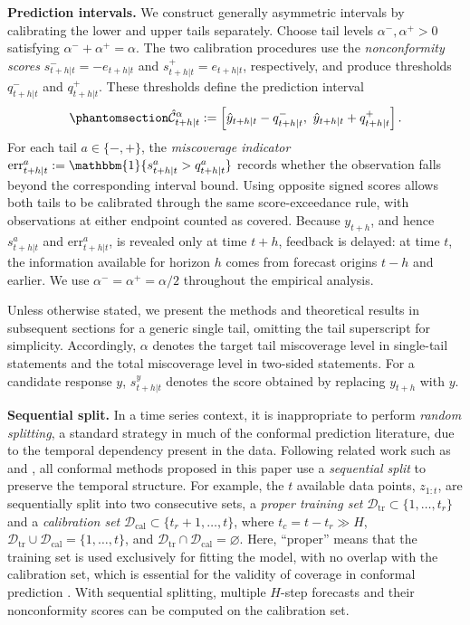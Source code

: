 \documentclass[
  american,
  12pt]{article}
\theoremstyle{plain}
\theoremstyle{plain}
\theoremstyle{remark}
\begin{document}
\textbf{Prediction intervals.} We construct generally asymmetric
intervals by calibrating the lower and upper tails separately. Choose
tail levels \(\alpha^{-},\alpha^{+}>0\) satisfying
\(\alpha^{-}+\alpha^{+}=\alpha\). The two calibration procedures use the
\emph{nonconformity scores} \(s_{t+h|t}^{-}=-e_{t+h|t}\) and
\(s_{t+h|t}^{+}=e_{t+h|t}\), respectively, and produce thresholds
\(q_{t+h|t}^{-}\) and \(q_{t+h|t}^{+}\). These thresholds define the
prediction interval
\begin{equation}\phantomsection\label{eq-two-sided-pi}{
\hat{\mathcal{C}}_{t+h|t}^{\alpha}
:=\left[\hat y_{t+h|t}-q_{t+h|t}^{-},\ \hat y_{t+h|t}+q_{t+h|t}^{+}\right].
}\end{equation} For each tail \(a\in\{-,+\}\), the \emph{miscoverage
indicator}
\(\mathrm{err}_{t+h|t}^{a}:=\mathbbm{1}\{s_{t+h|t}^{a}>q_{t+h|t}^{a}\}\)
records whether the observation falls beyond the corresponding interval
bound. Using opposite signed scores allows both tails to be calibrated
through the same score-exceedance rule, with observations at either
endpoint counted as covered. Because \(y_{t+h}\), and hence
\(s_{t+h|t}^{a}\) and \(\mathrm{err}_{t+h|t}^{a}\), is revealed only at
time \(t+h\), feedback is delayed: at time \(t\), the information
available for horizon \(h\) comes from forecast origins \(t-h\) and
earlier. We use \(\alpha^{-}=\alpha^{+}=\alpha/2\) throughout the
empirical analysis.

Unless otherwise stated, we present the methods and theoretical results
in subsequent sections for a generic single tail, omitting the tail
superscript for simplicity. Accordingly, \(\alpha\) denotes the target
tail miscoverage level in single-tail statements and the total
miscoverage level in two-sided statements. For a candidate response
\(y\), \(s_{t+h|t}^{y}\) denotes the score obtained by replacing
\(y_{t+h}\) with \(y\).

\textbf{Sequential split.} In a time series context, it is inappropriate
to perform \emph{random splitting}, a standard strategy in much of the
conformal prediction literature, due to the temporal dependency present
in the data. Following related work such as \citet{wisniewski2020} and
\citet{zaffran2022}, all conformal methods proposed in this paper use a
\emph{sequential split} to preserve the temporal structure. For example,
the \(t\) available data points, \(z_{1:t}\), are sequentially split
into two consecutive sets, a \emph{proper training set}
\(\mathcal{D}_{\text{tr}} \subset \{1, \dots, t_r\}\) and a
\emph{calibration set}
\(\mathcal{D}_{\text{cal}} \subset \{t_r+1, \dots, t\}\), where
\(t_c=t-t_r \gg H\),
\(\mathcal{D}_{\text{tr}} \cup \mathcal{D}_{\text{cal}} = \{1, \dots, t\}\),
and
\(\mathcal{D}_{\text{tr}} \cap \mathcal{D}_{\text{cal}} = \varnothing\).
Here, ``proper'' means that the training set is used exclusively for
fitting the model, with no overlap with the calibration set, which is
essential for the validity of coverage in conformal prediction
\citep{papadopoulos2002, vovk2005}. With sequential splitting, multiple
\(H\)-step forecasts and their nonconformity scores can be computed on
the calibration set.
\end{document}
